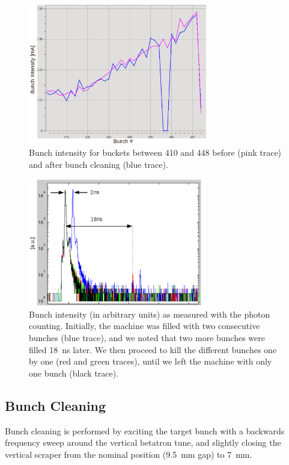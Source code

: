 \documentclass[a4paper,
              ]{jacow}
\begin{document}
\begin{figure}[t]
   \centering
   \includegraphics[width=78mm]{img/TUPB046f9}
   \caption{Bunch intensity for buckets between 410 and 448 before (pink trace) and after bunch cleaning (blue trace). }
   \label{bcleaning:MBM}
\end{figure}

\begin{figure}[t]
   \centering
   \includegraphics[width=76mm]{img/TUPB046f10}
   \caption{Bunch intensity (in arbitrary units) as measured with the photon counting. Initially, the machine was filled with two consecutive bunches (blue trace), and we noted that two more bunches were filled 18~ns later. We then proceed to kill the different bunches one by one (red and green traces), until we left the machine with only one bunch (black trace).   }
   \label{bcleaning:SBM}
\end{figure}

\subsection{Bunch Cleaning}


Bunch cleaning is performed by exciting the target bunch with a backwards frequency sweep around the vertical betatron tune, and slightly closing the vertical scraper from the nominal position (9.5~mm gap) to 7~mm. 
\end{document}
